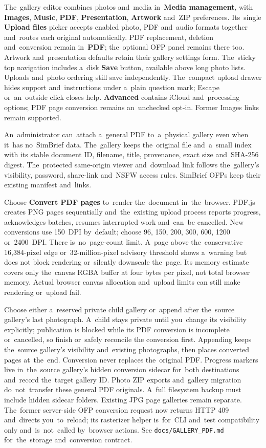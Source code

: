 \documentclass[11pt,a4paper]{article}
\newcommand{\ui}[1]{\textbf{#1}}
\newcommand{\codeword}[1]{\nolinkurl{#1}}
\begin{document}

The~gallery editor combines photos and~media in~\ui{Media management}, with
\ui{Images}, \ui{Music}, \ui{PDF}, \ui{Presentation}, \ui{Artwork}
and~ZIP preferences. Its~single \ui{Upload files} picker accepts enabled
photo, PDF and~audio formats together and~routes each original automatically.
PDF replacement, deletion and~conversion remain in~\ui{PDF}; the~optional
OFP panel remains there too. Artwork and~presentation defaults retain their
gallery settings form. The~sticky top navigation includes a~disk
\ui{Save} button, available above long photo lists. Uploads and~photo
ordering still save independently. The~compact upload drawer hides support
and~instructions under a~plain question mark; Escape or~an~outside click
closes help. \ui{Advanced} contains iCloud and~processing options; PDF page
conversion remains an~unchecked opt-in. Former Images links remain supported.

An~administrator can~attach a~general PDF to~a~physical gallery even when it~has
no~SimBrief data. The~gallery keeps the~original file and~a~small index with its
stable document ID, filename, title, provenance, exact size and~SHA-256 digest.
The~protected same-origin viewer and~download link follows the~gallery's
visibility, password, share-link and~NSFW access rules. SimBrief OFPs keep their
existing manifest and~links.

Choose \ui{Convert PDF pages} to~render the~document in~the~browser. PDF.js
creates PNG pages sequentially and~the~existing upload process reports progress,
acknowledges batches, resumes interrupted work and~can~be cancelled. New
conversions use 150~DPI by~default; choose 96, 150, 200, 300, 600, 1200
or~2400~DPI. There is~no~page-count limit. A~page above the~conservative
16,384-pixel edge or~32-million-pixel advisory threshold shows a~warning but
does not block rendering or~silently downscale the~page. Its memory estimate
covers only the~canvas RGBA buffer at four bytes per pixel, not total browser
memory. Actual browser canvas allocation and~upload limits can still make
rendering or~upload fail.

Choose either a~reserved private child gallery or~append after the~source
gallery's last photograph. A~child stays private until you~change its visibility
explicitly; publication is blocked while its PDF conversion is incomplete
or~cancelled, so finish or~safely reconcile the conversion first. Appending
keeps the~source gallery's visibility and~existing photographs, then places
converted pages at~the~end. Conversion never replaces the~original PDF. Progress
markers live in~the~source gallery's hidden conversion sidecar for~both
destinations and~record the~target gallery ID. Photo ZIP exports and~gallery
migration do~not~transfer these general PDF originals. A~full filesystem backup
must include hidden sidecar folders. Existing JPG page galleries remain
separate. The~former server-side OFP conversion request now returns HTTP 409
and~directs you~to~reload; its rasterizer helper is~for~CLI and~test
compatibility only and~is~not~called by~browser actions. See
\codeword{docs/GALLERY\_PDF.md} for~the~storage and~conversion contract.
\end{document}
